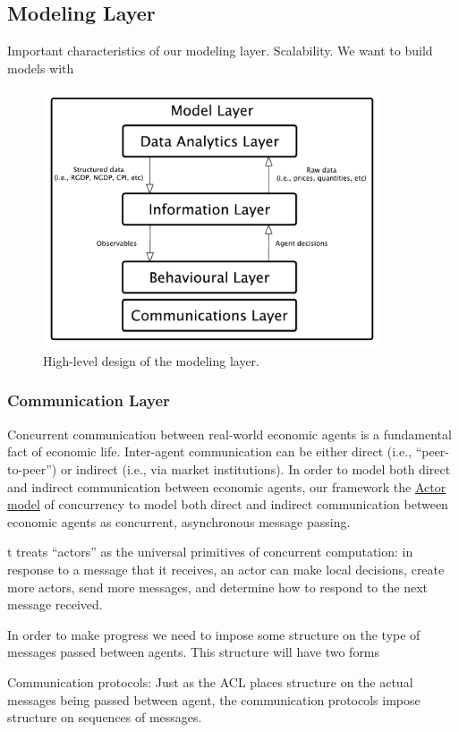 \documentclass[11pt]{amsart}
\begin{document}
\subsection{Modeling Layer}
Important characteristics of our modeling layer.  Scalability. We want to build models with 
\begin{figure}[H]
\centering
\includegraphics[width=10cm]{img/coarse-grain-model-layer.pdf}
\caption{High-level design of the modeling layer.}
\end{figure}

\subsubsection{Communication Layer}
Concurrent communication between real-world economic agents is a fundamental fact of economic life. Inter-agent communication can be either direct (i.e., ``peer-to-peer'') or indirect (i.e., via market institutions). In order to model both direct and indirect communication between economic agents, our framework  the \href{https://en.wikipedia.org/wiki/Actor_model}{Actor model} of concurrency to model both direct and indirect communication between economic agents as concurrent, asynchronous message passing.

t treats ``actors'' as the universal primitives of concurrent computation: in response to a message that it receives, an actor can make local decisions, create more actors, send more messages, and determine how to respond to the next message received.

In order to make progress we need to impose some structure on the type of messages passed between agents.  This structure will have two forms 


Communication protocols: Just as the ACL places structure on the actual messages being passed between agent, the communication protocols impose structure on sequences of messages.
\end{document}
